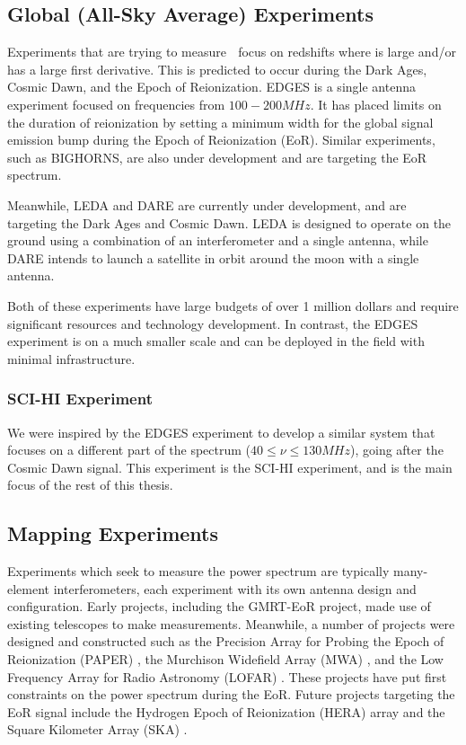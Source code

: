 \subsection{Global (All-Sky Average) Experiments}

Experiments that are trying to measure \avgdtb$\;$ focus on redshifts where \avgdtb is large and/or has a large first derivative. This is predicted to occur during the Dark Ages, Cosmic Dawn, and the Epoch of Reionization. EDGES \cite{bowman_2008} is a single antenna experiment focused on frequencies from $100-200 MHz$. It has placed limits on the duration of reionization by setting a minimum width for the \cm global signal emission bump during the Epoch of Reionization (EoR). Similar experiments, such as BIGHORNS\cite{bighorns}\cite{sokolowski_2015}, are also under development and are targeting the EoR spectrum.  

Meanwhile, LEDA \cite{leda}\cite{bernardi_2014} and DARE \cite{burns_2011} are currently under development, and are targeting the Dark Ages and Cosmic Dawn. LEDA is designed to operate on the ground using a combination of an interferometer and a single antenna, while DARE intends to launch a satellite in orbit around the moon with a single antenna. 

Both of these experiments have large budgets of over 1 million dollars and require significant resources and technology development. In contrast, the EDGES experiment is on a much smaller scale and can be deployed in the field with minimal infrastructure.

\subsubsection{SCI-HI Experiment}

We were inspired by the EDGES experiment to develop a similar system that focuses on a different part of the \cm spectrum ($40 \leq \nu \leq 130 MHz$), going after the Cosmic Dawn signal. This experiment is the SCI-HI experiment, and is the main focus of the rest of this thesis. 


\subsection{Mapping Experiments}

Experiments which seek to measure the \cm power spectrum are typically many-element interferometers, each experiment with its own antenna design and configuration. Early projects, including the GMRT-EoR \cite{paciga_2013} project, made use of existing telescopes to make measurements. Meanwhile, a number of projects were designed and constructed such as the Precision Array for Probing the Epoch of Reionization (PAPER) \cite{pober_2013}\cite{jacobs_2014}, the Murchison Widefield Array (MWA) \cite{bernardi_2013}\cite{tingay_2012}, and the Low Frequency Array for Radio Astronomy (LOFAR) \cite{jelic_2014}\cite{lofar}. These projects have put first constraints on the power spectrum during the EoR. Future projects targeting the EoR signal include the Hydrogen Epoch of Reionization (HERA) \cite{hera}\cite{bernardi_2014} array and the Square Kilometer Array (SKA) \cite{ska}.

